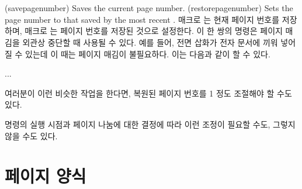 \begin{syntax}
\cmd{\savepagenumber} \\
\cmd{\restorepagenumber} \\
\end{syntax}
\glossary(savepagenumber)%
  {}%
  {Saves the current page number.}
\glossary(restorepagenumber)%
  {}%
  {Sets the page number to that saved by the most recent .}
매크로 \cmd{\savepagenumber}는 현재 페이지 번호를 저장하며, 매크로
\cmd{\restorepagenumber}는 페이지 번호를 저장된 것으로 설정한다.
이 한 쌍의 명령은 페이지 매김을 외관상
중단할 때 사용될 수 있다.
예를 들어, 전면 삽화가 전자 문서에 끼워 넣어질 수
있는데 이 때는 페이지 매김이 불필요하다.
이는 다음과 같이 할 수 있다.
\begin{lcode}
\clearpage          %
\savepagenumber     %
\pagestyle{empty}   %
\clearpage
\pagestyle{...}
\restorepagenumber
...
\end{lcode}
여러분이 이런 비슷한 작업을 한다면, 복원된 페이지 번호를 1 정도 조절해야 할
수도 있다.
\begin{lcode}
\restorepagenumber
\end{lcode}
 명령의 실행 시점과 페이지 나눔에 대한  결정에 따라 이런
조정이 필요할 수도, 그렇지 않을 수도 있다.



\section{페이지 양식} \label{sec:pagestyles}

